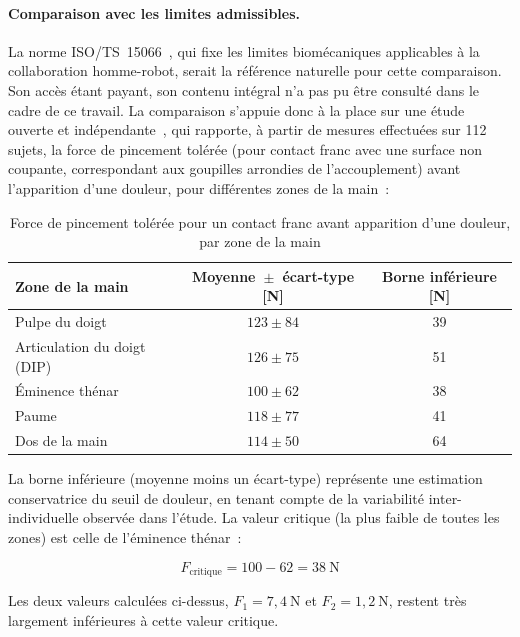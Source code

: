 \paragraph{Comparaison avec les limites admissibles.\\}
La norme ISO/TS~15066~\cite{iso_ts_15066}, qui fixe les limites biomécaniques
applicables à la collaboration homme-robot, serait la référence naturelle
pour cette comparaison. Son accès étant payant, son contenu intégral n'a pas
pu être consulté dans le cadre de ce travail. La comparaison s'appuie donc à
la place sur une étude ouverte et indépendante~\cite{behrens2022biomechanical},
qui rapporte, à partir de mesures effectuées sur 112 sujets, la force de
pincement tolérée (pour contact franc avec une surface non coupante, correspondant
aux goupilles arrondies de l'accouplement) avant l'apparition d'une
douleur, pour différentes zones de la main~:

\begin{table}[H]
  \centering
  \caption{Force de pincement tolérée pour un contact franc avant apparition d'une douleur, par zone de la main \cite{behrens2022biomechanical}}
  \label{tab:seuils_douleur_main}
  \begin{tabular}{|l|c|c|}
    \hline
    \textbf{Zone de la main} & \textbf{Moyenne~$\pm$~écart-type [N]} & \textbf{Borne inférieure [N]} \\
    \hline
    Pulpe du doigt      & $123 \pm 84$ & 39 \\
    Articulation du doigt (DIP) & $126 \pm 75$ & 51 \\
    Éminence thénar     & $100 \pm 62$ & 38 \\
    Paume               & $118 \pm 77$ & 41 \\
    Dos de la main      & $114 \pm 50$ & 64 \\
    \hline
  \end{tabular}
\end{table}

La borne inférieure (moyenne moins un écart-type) représente une estimation
conservatrice du seuil de douleur, en tenant compte de la variabilité
inter-individuelle observée dans l'étude. La valeur critique (la plus
faible de toutes les zones) est celle de l'éminence thénar~:

\begin{equation}
  F_{\text{critique}} = 100 - 62 = 38\ \text{N}
\end{equation}

Les deux valeurs calculées ci-dessus, $F_1 = 7{,}4\ \text{N}$ et
$F_2 = 1{,}2\ \text{N}$, restent très largement inférieures à cette valeur
critique.

